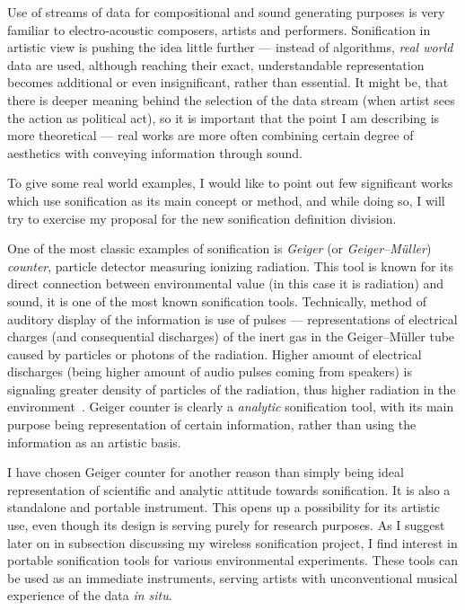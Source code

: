 \documentclass[12pt,a4paper,oneside]{report}
\begin{document}
Use of streams of data for compositional and sound generating purposes is very familiar to electro-acoustic composers, artists and performers. Sonification in artistic view is pushing the idea little further --- instead of algorithms, \emph{real world} data are used, although reaching their exact, understandable representation becomes additional or even insignificant, rather than essential. It might be, that there is deeper meaning behind the selection of the data stream (when artist sees the action as political act), so it is important that the point I am describing is more theoretical --- real works are more often combining certain degree of aesthetics with conveying information through sound.

To give some real world examples, I would like to point out few significant works which use sonification as its main concept or method, and while doing so, I will try to exercise my proposal for the new sonification definition division.

One of the most classic examples of sonification is \emph{Geiger} (or \emph{Geiger–Müller}) \emph{counter}, particle detector measuring ionizing radiation. This tool is known for its direct connection between environmental value (in this case it is radiation) and sound, it is one of the most known sonification tools. Technically, method of auditory display of the information is use of pulses --- representations of electrical charges (and consequential discharges) of the inert gas in the Geiger–Müller tube caused by particles or photons of the radiation. Higher amount of electrical discharges (being higher amount of audio pulses coming from speakers) is signaling greater density of particles of the radiation, thus higher radiation in the environment~\cite{Knoll2010}. Geiger counter is clearly a \emph{analytic} sonification tool, with its main purpose being representation of certain information, rather than using the information as an artistic basis.

I have chosen Geiger counter for another reason than simply being ideal representation of scientific and analytic attitude towards sonification. It is also a standalone and portable instrument. This opens up a possibility for its artistic use, even though its design is serving purely for research purposes. As I suggest later on in subsection discussing my wireless sonification project, I find interest in portable sonification tools for various environmental experiments. These tools can be used as an immediate instruments, serving artists with unconventional musical experience of the data \emph{in situ}.  
\end{document}
